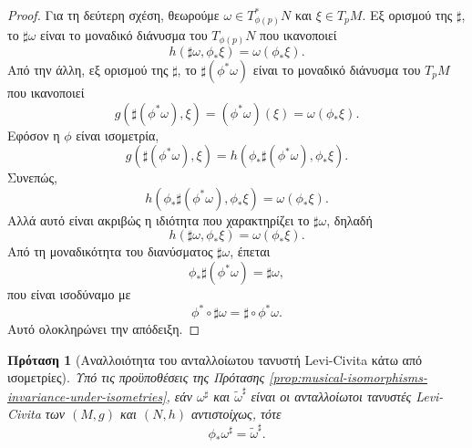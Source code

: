 \documentclass[11pt,a4paper,twoside,openright]{book}
\newtheorem{proposition}[lemma]{Πρόταση}
\begin{document}
\begin{proof}
Για τη δεύτερη σχέση, θεωρούμε $\omega \in T_{\phi(p)}^* N$ και $\xi \in T_pM$. Εξ ορισμού της $\sharp$, το $\sharp \omega$ είναι το μοναδικό διάνυσμα του $T_{\phi(p)}N$ που ικανοποιεί
\begin{equation*}
h(\sharp \omega, \phi_* \xi)
=
\omega(\phi_* \xi).
\end{equation*}
Από την άλλη, εξ ορισμού της $\sharp$, το $\sharp (\phi^* \omega)$ είναι το μοναδικό διάνυσμα του $T_pM$ που ικανοποιεί
\begin{equation*}
g(\sharp (\phi^* \omega), \xi)
=
(\phi^* \omega)(\xi)
=
\omega(\phi_* \xi).
\end{equation*}
Εφόσον η $\phi$ είναι ισομετρία,
\begin{equation*}
g(\sharp (\phi^* \omega), \xi)
=
h(\phi_* \sharp (\phi^* \omega), \phi_* \xi).
\end{equation*}
Συνεπώς,
\begin{equation*}
h(\phi_* \sharp (\phi^* \omega), \phi_* \xi)
=
\omega(\phi_* \xi).
\end{equation*}
Αλλά αυτό είναι ακριβώς η ιδιότητα που χαρακτηρίζει το $\sharp \omega$, δηλαδή
\begin{equation*}
h(\sharp \omega, \phi_* \xi)
=
\omega(\phi_* \xi).
\end{equation*}
Από τη μοναδικότητα του διανύσματος $\sharp \omega$, έπεται
\begin{equation*}
\phi_* \sharp (\phi^* \omega) = \sharp \omega,
\end{equation*}
που είναι ισοδύναμο με
\begin{equation*}
\phi^* \circ \sharp \omega = \sharp \circ \phi^* \omega.
\end{equation*}
Αυτό ολοκληρώνει την απόδειξη.
\end{proof}

\begin{proposition}[Αναλλοιότητα του ανταλλοίωτου τανυστή Levi-Civita κάτω από ισομετρίες]
	\label{prop:contravariant-levi-civita-invariance-under-isometries}
Υπό τις προϋποθέσεις της Πρότασης \ref{prop:musical-isomorphisms-invariance-under-isometries},
εάν $\omega^\sharp$ και $\widetilde{\omega}^\sharp$ είναι οι ανταλλοίωτοι τανυστές Levi-Civita των $(M, g)$ και $(N, h)$ αντιστοίχως, τότε
\begin{equation}\label{eq:contravariant-levi-civita-invariance-under-isometry}
\phi_* \omega^\sharp = \widetilde{\omega}^\sharp.
\end{equation}
\end{proposition}
\end{document}
